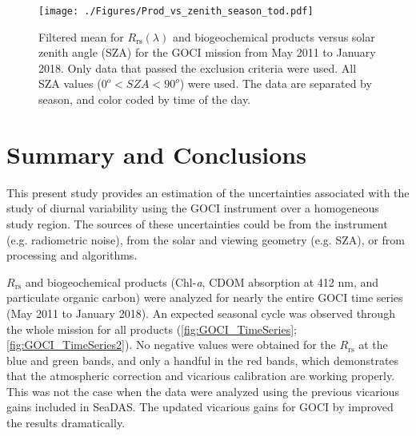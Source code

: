 \documentclass[remotesensing,article,submit,moreauthors,pdftex,10pt,a4paper]{Definitions/mdpi}
\begin{document}
\begin{figure}[htbp!]
  \texttt{[image: ./Figures/Prod\_vs\_zenith\_season\_tod.pdf]}
  \caption{Filtered mean for $R_\text{rs}(\lambda)$ and biogeochemical products versus solar zenith angle (SZA) for the GOCI mission from May 2011 to January 2018. Only data that passed the exclusion criteria were used. All SZA values ($0^o<SZA<90^o$) were used. The data are separated by season, and color coded by time of the day. \label{fig:Prod_vs_zenith_season_tod} } 
\end{figure}

\section{Summary and Conclusions} 





This present study provides an estimation of the uncertainties associated with the study of diurnal variability using the GOCI instrument over a homogeneous study region. The sources of these uncertainties could be from the instrument (e.g. radiometric noise), from the solar and viewing geometry (e.g. SZA), or from processing and algorithms. 

$R_\text{rs}$ and biogeochemical products (Chl-{\it a}, CDOM absorption at 412 nm, and particulate organic carbon) were analyzed for nearly the entire GOCI time series (May 2011 to January 2018). An expected seasonal cycle was observed through the whole mission for all products (\autoref{fig:GOCI_TimeSeries}; \autoref{fig:GOCI_TimeSeries2}). No negative values were obtained for the $R_\text{rs}$ at the blue and green bands, and only a handful in the red bands, which demonstrates that the atmospheric correction and vicarious calibration are working properly. This was not the case when the data were analyzed using the previous vicarious gains included in SeaDAS. The updated vicarious gains for GOCI by \cite{Concha_2018a} improved the results dramatically.
\end{document}

